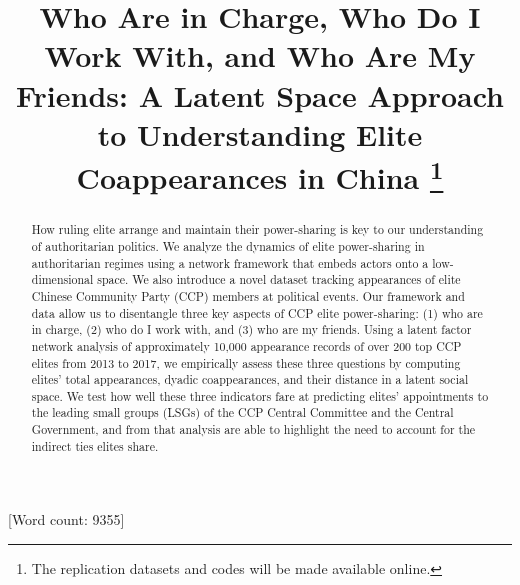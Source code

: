 \documentclass[11pt,english]{article}
\date{}
\providecommand{\DIFaddbegin}{} %
\providecommand{\DIFaddend}{} %
\providecommand{\DIFdelbegin}{} %
\providecommand{\DIFdelend}{} %
\newcommand{\DIFscaledelfig}{0.5}
\newlength{\DIFdelgraphicswidth} %
\newlength{\DIFdelgraphicsheight} %
\newcommand{\DIFaddincludegraphics}[2][]{{\color{blue}\fbox{\DIFOincludegraphics[#1]{#2}}}} %
\newcommand{\DIFdelincludegraphics}[2][]{%
\sbox{\DIFdelgraphicsbox}{\DIFOincludegraphics[#1]{#2}}%
\settoboxwidth{\DIFdelgraphicswidth}{\DIFdelgraphicsbox} %
\settoboxtotalheight{\DIFdelgraphicsheight}{\DIFdelgraphicsbox} %
\scalebox{\DIFscaledelfig}{%
\parbox[b]{\DIFdelgraphicswidth}{\usebox{\DIFdelgraphicsbox}\\[-\baselineskip] \rule{\DIFdelgraphicswidth}{0em}}\llap{\resizebox{\DIFdelgraphicswidth}{\DIFdelgraphicsheight}{%
\setlength{\unitlength}{\DIFdelgraphicswidth}%
\begin{picture}(1,1)%
\thicklines\linethickness{2pt} %
{\color[rgb]{1,0,0}\put(0,0){\framebox(1,1){}}}%
{\color[rgb]{1,0,0}\put(0,0){\line( 1,1){1}}}%
{\color[rgb]{1,0,0}\put(0,1){\line(1,-1){1}}}%
\end{picture}%
}\hspace*{3pt}}} %
} %
\DeclareRobustCommand{\DIFaddbegin}{\DIFOaddbegin \let\includegraphics\DIFaddincludegraphics} %
\DeclareRobustCommand{\DIFaddend}{\DIFOaddend \let\includegraphics\DIFOincludegraphics} %
\DeclareRobustCommand{\DIFdelbegin}{\DIFOdelbegin \let\includegraphics\DIFdelincludegraphics} %
\DeclareRobustCommand{\DIFdelend}{\DIFOaddend \let\includegraphics\DIFOincludegraphics} %
\begin{document}
\begin{spacing}{1}

\DIFdelbegin %
\DIFdelend %

\title{\textbf{Who Are in Charge, Who Do I Work With, and Who Are My Friends:
A Latent Space Approach to Understanding Elite Coappearances in China}\DIFdelbegin %
\DIFdelend \DIFaddbegin \thanks{The replication datasets and codes will be made available online.
}\DIFaddend }


\maketitle
\begin{abstract}
\begin{flushleft}

How ruling elite arrange and maintain their power-sharing is key to our understanding of authoritarian politics. We analyze the dynamics of elite power-sharing in authoritarian regimes using a network framework that embeds actors onto a low-dimensional space. We also introduce a novel dataset tracking appearances of elite Chinese Community Party (CCP) members at political events. Our framework and data allow us to disentangle three key aspects of CCP elite power-sharing: (1) who are in charge, (2) who do I work with, and (3) who are my friends. Using a latent factor network analysis of approximately 10,000 appearance records of over 200 top CCP elites from 2013 to 2017, we empirically assess these three questions by computing elites' total appearances, dyadic coappearances, and their distance in a latent social space. We test how well these three indicators fare at predicting elites' appointments to the leading small groups (LSGs) of the CCP Central Committee and the Central Government, and from that analysis are able to highlight the need to account for the indirect ties elites share.

\end{flushleft}
\end{abstract}
\end{spacing}
[Word count: 9355]
\DIFaddbegin \newpage{}
\DIFaddend 
\end{document}
